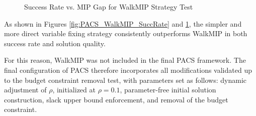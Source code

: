 \begin{figure}[H]
\centering
\begin{minipage}{0.6\columnwidth}
\centering
\resizebox{\linewidth}{!}{}
\end{minipage}%
\hfill
\begin{minipage}{0.4\columnwidth}
\centering
\resizebox{\linewidth}{!}{}
\end{minipage}
\caption{Success Rate vs. MIP Gap for WalkMIP Strategy Test}
\label{fig:PACS_WalkMIP_MGAP}
\end{figure}

As shown in Figures \ref{fig:PACS_WalkMIP_SuccRate} and \ref{fig:PACS_WalkMIP_MGAP}, the simpler and more direct variable fixing strategy consistently outperforms WalkMIP in both success rate and solution quality.

For this reason, WalkMIP was not included in the final PACS framework. The final configuration of PACS therefore incorporates all modifications validated up to the budget constraint removal test, with parameters set as follows: dynamic adjustment of $\rho$, initialized at $\rho=0.1$, parameter-free initial solution construction, slack upper bound enforcement, and removal of the budget constraint.

